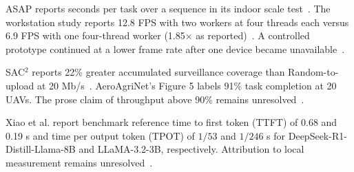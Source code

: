 \documentclass[pdflatex,sn-vancouver-num]{sn-jnl}
\begin{document}
ASAP reports seconds per task over a sequence in its indoor scale test~\cite{R0014}. The workstation study reports 12.8 FPS with two workers at four threads each versus 6.9 FPS with one four-thread worker (1.85$\times$ as reported)~\cite{R0125}. A controlled prototype continued at a lower frame rate after one device became unavailable~\cite{R0062}.\par SAC$^2$ reports 22\% greater accumulated surveillance coverage than Random-to-upload at 20 Mb/s~\cite{R0036}. AeroAgriNet's Figure 5 labels 91\% task completion at 20 UAVs. The prose claim of throughput above 90\% remains unresolved~\cite{R0090}.\par Xiao et al. report benchmark reference time to first token (TTFT) of 0.68 and 0.19 s and time per output token (TPOT) of $1/53$ and $1/246$ s for DeepSeek-R1-Distill-Llama-8B and LLaMA-3.2-3B, respectively. Attribution to local measurement remains unresolved~\cite{R0145}.
\FloatBarrier
\begingroup\fontsize{8}{10}\selectfont\setlength{\tabcolsep}{2.5pt}\renewcommand{\arraystretch}{1.22}
\end{document}
